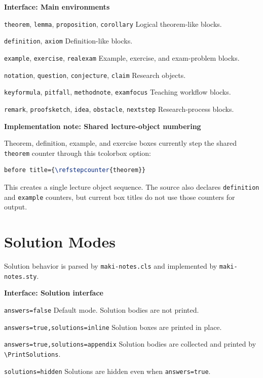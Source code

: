 \documentclass[a4paper,11pt]{ltxdoc}
\newcommand{\mfile}[1]{\texttt{#1}}
\newcommand{\mpkg}[1]{\textsf{#1}}
\newcommand{\mopt}[1]{\texttt{#1}}
\newcommand{\menv}[1]{\texttt{#1}}
\newcommand{\mcmd}[1]{\texttt{\textbackslash#1}}
\newcommand{\mkey}[1]{\texttt{#1}}
\newenvironment{implementation}[1]
  {\par\medskip\noindent\textbf{\color{MakiBlue}Implementation note: #1}\par\smallskip}
  {\par\medskip}
\newenvironment{interfaceblock}[1]
  {\par\medskip\noindent\textbf{\color{MakiBlue}Interface: #1}\par\smallskip\begin{description}[leftmargin=3.2cm,style=nextline]}
  {\end{description}\par\medskip}
\begin{document}
\begin{interfaceblock}{Main environments}
\item[\menv{theorem}, \menv{lemma}, \menv{proposition}, \menv{corollary}] Logical theorem-like blocks.
\item[\menv{definition}, \menv{axiom}] Definition-like blocks.
\item[\menv{example}, \menv{exercise}, \menv{realexam}] Example, exercise, and exam-problem blocks.
\item[\menv{notation}, \menv{question}, \menv{conjecture}, \menv{claim}] Research objects.
\item[\menv{keyformula}, \menv{pitfall}, \menv{methodnote}, \menv{examfocus}] Teaching workflow blocks.
\item[\menv{remark}, \menv{proofsketch}, \menv{idea}, \menv{obstacle}, \menv{nextstep}] Research-process blocks.
\end{interfaceblock}

\begin{implementation}{Shared lecture-object numbering}
Theorem, definition, example, and exercise boxes currently step the shared
\mkey{theorem} counter through this \mpkg{tcolorbox} option:
\begin{lstlisting}[language=TeX]
before title={\refstepcounter{theorem}}
\end{lstlisting}
This creates a single lecture object sequence. The source also declares
\mkey{definition} and \mkey{example} counters, but current box titles do not use
those counters for output.
\end{implementation}

\section{Solution Modes}

Solution behavior is parsed by \mfile{maki-notes.cls} and implemented by
\mfile{maki-notes.sty}.

\begin{interfaceblock}{Solution interface}
\item[\mopt{answers=false}] Default mode. Solution bodies are not printed.
\item[\mopt{answers=true,solutions=inline}] Solution boxes are printed in place.
\item[\mopt{answers=true,solutions=appendix}] Solution bodies are collected and printed by \mcmd{PrintSolutions}.
\item[\mopt{solutions=hidden}] Solutions are hidden even when \mopt{answers=true}.
\end{interfaceblock}
\end{document}
